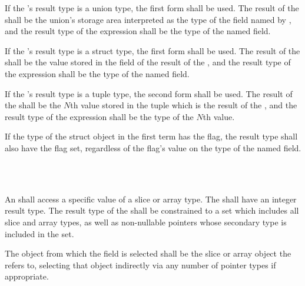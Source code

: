 \specsubsubitem
If the 's result type is a union type, the
first form shall be used. The result of the
 shall be the union's storage area
interpreted as the type of the field named by , and the
result type of the expression shall be the type of the named field.

\specsubsubitem
If the 's result type is a struct type, the
first form shall be used. The result of the
 shall be the value stored in the
 field of the result of the ,
and the result type of the expression shall be the type of the named field.

\specsubsubitem
If the 's result type is a tuple type,
the second form shall be used. The result of the
 shall be the $N$th value stored in the
tuple which is the result of the , and the
result type of the expression shall be the type of the $N$th value.

\specsubsubitem
If the type of the struct object in the first term has the 
flag, the result type shall also have the  flag set, regardless
of the flag's value on the type of the named field.


\begin{grammar}
 \\
	 \terminal{[}  \terminal{]} \\
\end{grammar}

\specsubsubitem
An  shall access a specific value of a slice
or array type. The  shall have an integer result type.
The result type of the  shall be constrained to
a set which includes all slice and array types, as well as non-nullable pointers
whose secondary type is included in the set.


\specsubsubitem
The object from which the field is selected shall be the slice or array object
the  refers to, selecting that object indirectly
via any number of pointer types if appropriate.

